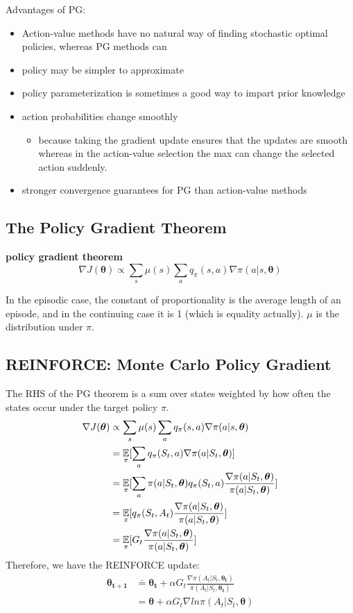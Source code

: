 \documentclass[sutton_barto_notes.tex]{subfiles}
\begin{document}
Advantages of PG:
\begin{itemize}
\item Action-value methods have no natural way of finding stochastic optimal policies, whereas PG methods can
\item policy may be simpler to approximate
\item policy parameterization is sometimes a good way to impart prior knowledge
\item action probabilities change smoothly
\begin{itemize}
	\item because taking the gradient update ensures that the updates are smooth whereas in the action-value selection the max can change the selected action suddenly.
\end{itemize}
\item stronger convergence guarantees for PG than action-value methods
\end{itemize}


\subsection{The Policy Gradient Theorem}

\begin{definition}
\textbf{policy gradient theorem}
$$\nabla J(\bm{\theta}) \propto \sum_s\mu(s)\sum_a q_\pi(s,a)\nabla\pi(a|s,\bm{\theta})$$
\end{definition}
In the episodic case, the constant of proportionality is the average length of an episode, and in the continuing case it is 1 (which is equality actually). $\mu$ is the distribution under $\pi$.

\subsection{REINFORCE: Monte Carlo Policy Gradient}

The RHS of the PG theorem is a sum over states weighted by how often the states occur under the target policy $\pi$.
\begin{align*}
\nabla J(\bm{\theta}) & \propto \sum_s\mu(s)\sum_a q_\pi(s,a)\nabla\pi(a|s,\bm{\theta}) \\
&= \operatorname*{\mathbb{E}}_\pi [\sum_a q_\pi(S_t, a)\nabla\pi(a|S_t, \bm{\theta})] \\
&= \operatorname*{\mathbb{E}}_\pi [\sum_a \pi(a|S_t,\bm{\theta}) q_\pi(S_t, a) \frac{\nabla\pi(a|S_t, \bm{\theta})}{\pi(a|S_t, \bm{\theta})} ] \\
&= \operatorname*{\mathbb{E}}_\pi [q_\pi(S_t, A_t) \frac{\nabla\pi(a|S_t, \bm{\theta})}{\pi(a|S_t, \bm{\theta})}] \\
&= \operatorname*{\mathbb{E}}_\pi [G_t \frac{\nabla\pi(a|S_t, \bm{\theta})}{\pi(a|S_t, \bm{\theta})}]
\end{align*}
Therefore, we have the REINFORCE update:
\begin{align*}
\bm{\theta_{t+1}} &\doteq \bm{\theta_t} + \alpha G_t \frac{\nabla\pi(A_t|S_t,\bm{\theta_t})}{\pi(A_t|S_t,\bm{\theta_t})} \\
&= \bm{\theta} + \alpha G_t \nabla ln \pi(A_t|S_t, \bm{\theta})
\end{align*}
\end{document}
